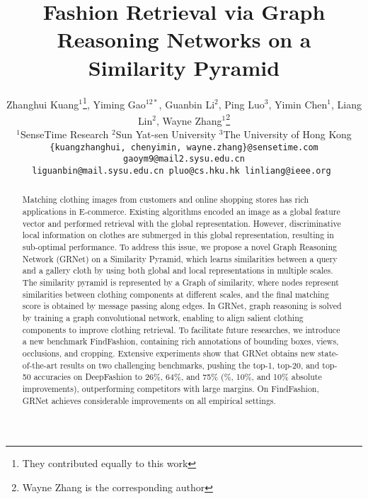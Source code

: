 \documentclass[10pt,twocolumn,letterpaper]{article}
\begin{document}
\title{Fashion Retrieval via Graph Reasoning Networks on a Similarity Pyramid}

\author{
Zhanghui Kuang$^{1}$\thanks{They contributed equally to this work},\hspace{1px} Yiming Gao$^{12*}$,\hspace{1px} Guanbin Li$^2$,\hspace{1px} Ping Luo$^3$,\hspace{1px} Yimin Chen$^1$,\hspace{1px} Liang Lin$^2$,\hspace{1px} Wayne Zhang$^1$\thanks{Wayne Zhang is the corresponding author}\\
$^1$SenseTime Research \hspace{3px} $^2$Sun Yat-sen University \hspace{3px} $ ^3$The University of Hong Kong\\
\tt\small \{kuangzhanghui, chenyimin,  wayne.zhang\}@sensetime.com \hspace{2px} gaoym9@mail2.sysu.edu.cn \hspace{2px} \\
\tt\small liguanbin@mail.sysu.edu.cn \hspace{2px} pluo@cs.hku.hk \hspace{2px} linliang@ieee.org
}
\maketitle
\thispagestyle{empty}


\begin{abstract}
 Matching clothing images from customers and online shopping stores has rich applications in E-commerce. Existing algorithms encoded an image as a global feature vector and performed retrieval with the global representation. However, discriminative local information on clothes are submerged in this global representation, resulting in sub-optimal performance.
 To address this issue, we propose a novel Graph Reasoning Network (GRNet) on a Similarity Pyramid, which learns similarities between a query and a gallery cloth by using both global and local representations in multiple scales.
  The similarity pyramid is represented by a Graph of similarity, where nodes represent similarities between clothing components at different scales, and the final matching score is obtained by message passing along edges. In GRNet, graph reasoning is solved by training a graph convolutional network, enabling to align salient clothing components to improve clothing retrieval.
  To facilitate future researches,
  we introduce a new benchmark FindFashion, containing rich annotations of bounding boxes, views, occlusions, and cropping.
  Extensive experiments show that GRNet obtains new state-of-the-art results on two challenging benchmarks, \eg pushing the top-1, top-20, and top-50 accuracies on DeepFashion to 26\%, 64\%, and 75\% (\%, 10\%, and 10\% absolute improvements), outperforming competitors with large margins. On FindFashion, GRNet achieves considerable improvements on all empirical settings.
 \end{abstract}
\end{document}
